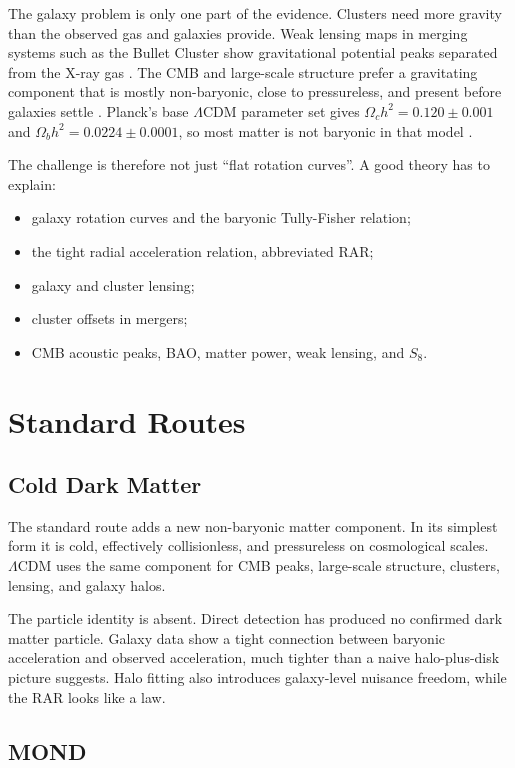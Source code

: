\documentclass[11pt]{article}
\newcommand{\LCDM}{\Lambda\mathrm{CDM}}
\begin{document}
The galaxy problem is only one part of the evidence.  Clusters need more
gravity than the observed gas and galaxies provide.  Weak lensing maps in
merging systems such as the Bullet Cluster show gravitational potential peaks
separated from the X-ray gas \cite{clowe2006}.  The CMB and large-scale
structure prefer a gravitating component that is mostly non-baryonic, close to
pressureless, and present before galaxies settle \cite{planck2018}.  Planck's
base \(\LCDM\) parameter set gives
\(\Omega_c h^2=0.120\pm0.001\) and
\(\Omega_b h^2=0.0224\pm0.0001\), so most matter is not baryonic in that
model \cite{planck2018}.

The challenge is therefore not just ``flat rotation curves''.  A good theory
has to explain:
\begin{itemize}
\item galaxy rotation curves and the baryonic Tully-Fisher relation;
\item the tight radial acceleration relation, abbreviated RAR;
\item galaxy and cluster lensing;
\item cluster offsets in mergers;
\item CMB acoustic peaks, BAO, matter power, weak lensing, and \(S_8\).
\end{itemize}

\section{Standard Routes}

\subsection{Cold Dark Matter}

The standard route adds a new non-baryonic matter component.  In its simplest
form it is cold, effectively collisionless, and pressureless on cosmological
scales.  \(\LCDM\) uses the same component for CMB peaks, large-scale
structure, clusters, lensing, and galaxy halos.

The particle identity is absent.  Direct detection has produced no confirmed
dark matter particle.  Galaxy data show a tight
connection between baryonic acceleration and observed acceleration, much
tighter than a naive halo-plus-disk picture suggests.  Halo fitting also
introduces galaxy-level nuisance freedom, while the RAR looks like a law.

\subsection{MOND}
\end{document}
